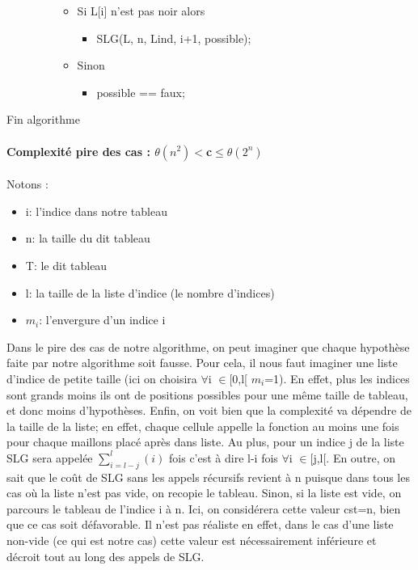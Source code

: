 \documentclass{article}
\begin{document}
\begin{description}
\begin{itemize}
\begin{itemize}
    \item Si L[i] n'est pas noir alors
      \begin{itemize}
      \item SLG(L, n, Lind, i+1, possible);
      \end{itemize}
    \item Sinon 
      \begin{itemize}
      \item possible == faux;
      \end{itemize}
    \end{itemize}
  \end{itemize}
\item[Fin algorithme]
\end{description}
\paragraph{Complexité pire des cas : $\theta(n^2) <$c$\leq\theta(2^n)$\\ }
 Notons :
\begin{itemize}
\item i: l'indice dans notre tableau
\item n: la taille du dit tableau
\item T: le dit tableau
\item l: la taille de la liste d'indice (le nombre d'indices)
\item $m_i$: l'envergure d'un indice i
\end{itemize}
Dans le pire des cas de notre algorithme, on peut imaginer que chaque hypothèse faite par notre algorithme soit fausse. Pour cela, il nous faut imaginer une liste d'indice de petite taille (ici on choisira $\forall$i $\in$[0,l[ $m_i$=1). En effet, plus les indices sont grands moins ils ont de positions possibles pour une même taille de tableau, et donc moins d'hypothèses.
\newline Enfin, on voit bien que la complexité va dépendre de la taille de la liste; en effet, chaque cellule appelle la fonction au moins une fois pour chaque maillons placé après dans liste. Au plus, pour un indice j de la liste SLG sera appelée $\sum_{i=l-j}^{l} (i)$ fois c'est à dire l-i fois $\forall$i $\in$[j,l[.
\newline En outre, on sait que le coût de SLG sans les appels récursifs revient à n puisque dans tous les cas où la liste n'est pas vide, on recopie le tableau. Sinon, si la liste est vide, on parcours le tableau de l'indice i à n. Ici, on considérera cette valeur cst=n, bien que ce cas soit défavorable. Il n'est pas réaliste en effet, dans le cas d'une liste non-vide (ce qui est notre cas) cette valeur est nécessairement inférieure et décroit tout au long des appels de SLG.
\end{document}
